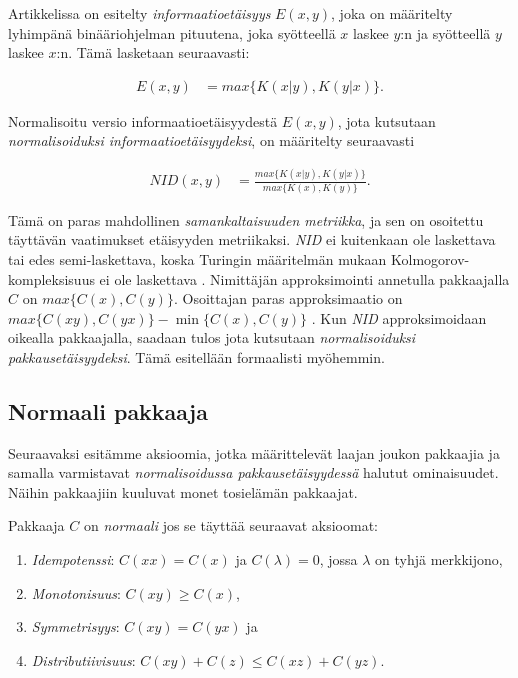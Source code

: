 \documentclass[12pt,finnish,final]{tktltiki2}
\theoremstyle{definition}
\theoremstyle{remark}
\newcommand{\kolmogorov}{Kolmogorov-kompleksisuus}
\begin{document}
  Artikkelissa \cite{CV05} on esitelty \emph{informaatioetäisyys} $E(x,y)$, joka on määritelty lyhimpänä binääriohjelman pituutena, joka syötteellä $x$ laskee $y$:n ja syötteellä $y$ laskee $x$:n. Tämä lasketaan seuraavasti:

  \begin{align}
    E(x,y) &= max\{K(x|y),K(y|x)\}.
  \end{align}

  Normalisoitu versio informaatioetäisyydestä $E(x,y)$, jota kutsutaan \emph{normalisoiduksi informaatioetäisyydeksi}, on määritelty seuraavasti

  \begin{align}
    NID(x,y) &= \frac{ max\{K{(x|y)},K{(y|x)}\} }{ max \{K(x),K(y)\}}.
  \end{align}

  Tämä on paras mahdollinen \emph{samankaltaisuuden metriikka}, ja sen on osoitettu \cite{CV05} täyttävän vaatimukset etäisyyden metriikaksi.
  \emph{NID} ei kuitenkaan ole laskettava tai edes semi-laskettava, koska Turingin määritelmän mukaan \kolmogorov{} ei ole laskettava \cite{CV05}.
  Nimittäjän approksimointi annetulla pakkaajalla $C$ on $max \{C(x),C(y)\}$.
  Osoittajan paras approksimaatio on $max\{C(xy),C(yx)\} - \min\{C(x),C(y)\}$ \cite{CV05}.
  Kun \emph{NID} approksimoidaan oikealla pakkaajalla, saadaan tulos jota kutsutaan \emph{normalisoiduksi pakkausetäisyydeksi}.
  Tämä esitellään formaalisti myöhemmin.

\subsection{Normaali pakkaaja} %
\label{sub:normaali_pakkaaja}

  Seuraavaksi esitämme aksioomia, jotka määrittelevät laajan joukon pakkaajia ja samalla varmistavat \emph{normalisoidussa pakkausetäisyydessä} halutut ominaisuudet.
  Näihin pakkaajiin kuuluvat monet tosielämän pakkaajat.

  Pakkaaja $C$ on \emph{normaali} jos se täyttää seuraavat aksioomat:

  \label{idempotency}
  \begin{enumerate}
    \item \emph{Idempotenssi}: $C(xx) = C(x)$ ja $C(\lambda) = 0$, jossa $\lambda$ on tyhjä merkkijono,
    \item \emph{Monotonisuus}: $C(xy) \geq C(x)$,
    \item \emph{Symmetrisyys}: $C(xy) = C(yx)$ ja
    \item \emph{Distributiivisuus}: $C(xy) + C(z) \leq C(xz) + C(yz)$.
  \end{enumerate}
\end{document}

